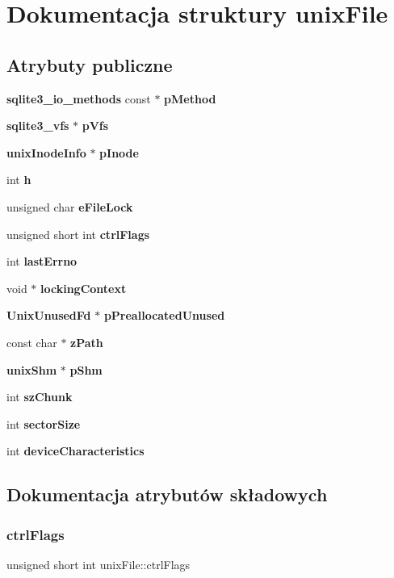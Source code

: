 \section{Dokumentacja struktury unix\+File}
\label{structunix_file}
\subsection*{Atrybuty publiczne}
\begin{DoxyCompactItemize}
\item 
\textbf{ sqlite3\+\_\+io\+\_\+methods} const  $\ast$ \textbf{ p\+Method}
\item 
\textbf{ sqlite3\+\_\+vfs} $\ast$ \textbf{ p\+Vfs}
\item 
\textbf{ unix\+Inode\+Info} $\ast$ \textbf{ p\+Inode}
\item 
int \textbf{ h}
\item 
unsigned char \textbf{ e\+File\+Lock}
\item 
unsigned short int \textbf{ ctrl\+Flags}
\item 
int \textbf{ last\+Errno}
\item 
void $\ast$ \textbf{ locking\+Context}
\item 
\textbf{ Unix\+Unused\+Fd} $\ast$ \textbf{ p\+Preallocated\+Unused}
\item 
const char $\ast$ \textbf{ z\+Path}
\item 
\textbf{ unix\+Shm} $\ast$ \textbf{ p\+Shm}
\item 
int \textbf{ sz\+Chunk}
\item 
int \textbf{ sector\+Size}
\item 
int \textbf{ device\+Characteristics}
\end{DoxyCompactItemize}


\subsection{Dokumentacja atrybutów składowych}
\mbox{\label{structunix_file_a05d9d0af8aa4d9de6a250984cc12ae56}} 
\subsubsection{ctrlFlags}
{\footnotesize\ttfamily unsigned short int unix\+File\+::ctrl\+Flags}

\mbox{\label{structunix_file_a9b42bed1e21265286a1aeecc5b3a1df1}} 
